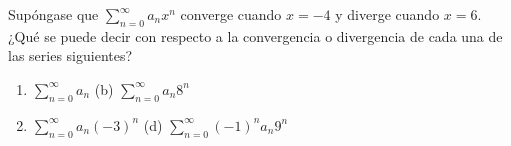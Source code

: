\item Supóngase que $\displaystyle\sum_{n=0}^\infty a_n x^n$ converge cuando $x = -4$ y diverge cuando $x = 6$. ¿Qué se puede decir con respecto a la convergencia o divergencia de cada una de las series siguientes?
    \begin{enumerate}
        \item[(a)] $\displaystyle\sum_{n=0}^\infty a_n$ \qquad\qquad\qquad\qquad (b) $\displaystyle\sum_{n=0}^\infty a_n 8^n$
        \item[(c)] $\displaystyle\sum_{n=0}^\infty a_n (-3)^n$ \qquad\qquad\qquad (d) $\displaystyle\sum_{n=0}^\infty (-1)^n a_n 9^n$
    \end{enumerate}

